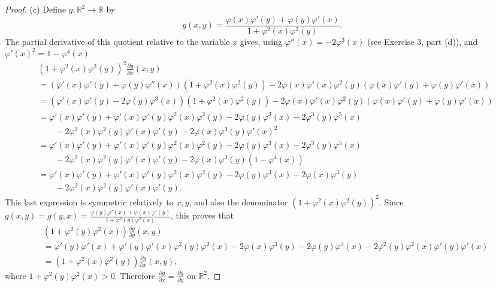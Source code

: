 \documentclass[11pt,a4paper]{article}
\newcommand{\R}{\mathbb{R}}
\begin{document}
\begin{proof}
\item[(c)] Define $g : \R^2 \to \R$ by
$$g(x,y) = \frac{\varphi(x) \varphi'(y) + \varphi(y) \varphi'(x)}{1 + \varphi^2(x) \varphi^2(y)}.$$
The partial derivative of this quotient relative to the variable $x$ gives, using $\varphi''(x) = -2 \varphi^3(x)$ (see Exercise 3, part (d)), and $\varphi'(x)^2 = 1 -\varphi^4(x)$
\begin{align*}
&\left(1 + \varphi^2(x)\varphi^2(y)\right)^2 \frac{\partial g}{\partial x} (x,y) \\
&= \left(\varphi'(x) \varphi'(y) + \varphi(y) \varphi''(x)\right)\left(1+ \varphi^2(x)\varphi^2(y)\right) - 2 \varphi(x) \varphi'(x) \varphi^2(y) \left(\varphi(x) \varphi'(y)+ \varphi(y)\varphi'(x)\right)\\
&= \left(\varphi'(x) \varphi'(y) -2 \varphi(y)\varphi^3(x)\right)\left(1+ \varphi^2(x)\varphi^2(y)\right) - 2 \varphi(x) \varphi'(x) \varphi^2(y) \left(\varphi(x) \varphi'(y)+ \varphi(y)\varphi'(x)\right)\\
&=\varphi'(x) \varphi'(y) + \varphi'(x) \varphi'(y) \varphi^2(x) \varphi^2(y) - 2 \varphi(y) \varphi^3(x) - 2 \varphi^3(y)\varphi^5(x)\\
&  \qquad - 2 \varphi^2(x) \varphi^2(y) \varphi'(x)\varphi'(y) - 2 \varphi(x) \varphi^3(y) \varphi'(x)^2\\
&=\varphi'(x) \varphi'(y) + \varphi'(x) \varphi'(y) \varphi^2(x) \varphi^2(y) - 2 \varphi(y) \varphi^3(x) - 2 \varphi^3(y)\varphi^5(x)\\
&  \qquad - 2 \varphi^2(x) \varphi^2(y) \varphi'(x)\varphi'(y) - 2 \varphi(x) \varphi^3(y) (1 - \varphi^4(x))\\
&=\varphi'(x) \varphi'(y) + \varphi'(x) \varphi'(y) \varphi^2(x) \varphi^2(y) - 2 \varphi(y) \varphi^3(x) -2\varphi(x) \varphi^3(y)\\
&  \qquad - 2 \varphi^2(x) \varphi^2(y) \varphi'(x)\varphi'(y).
\end{align*}
This last expression is symmetric relatively to $x,y$, and also the denominator $(1 + \varphi^2(x)\varphi^2(y))^2$.  Since $g(x,y) = g(y,x) =  \frac{\varphi(y) \varphi'(x) + \varphi(x) \varphi'(y)}{1 + \varphi^2(y) \varphi^2(x)}$, this proves that 
\begin{align*}
&\left(1 + \varphi^2(y)\varphi^2(x)\right) \frac{\partial g}{\partial y} (x,y)\\
&=\varphi'(y) \varphi'(x) + \varphi'(y) \varphi'(x) \varphi^2(y) \varphi^2(x) - 2 \varphi(x) \varphi^3(y) -2\varphi(y) \varphi^3(x)- 2 \varphi^2(y) \varphi^2(x) \varphi'(y)\varphi'(x)\\
&= \left(1 + \varphi^2(x)\varphi^2(y)\right) \frac{\partial g}{\partial x} (x,y),
\end{align*}
where $1 + \varphi^2(y)\varphi^2(x)>0$.
Therefore $\frac{\partial g}{\partial x} = \frac{\partial g}{\partial y}$ on $\R^2$. 


\end{proof}
\end{document}
